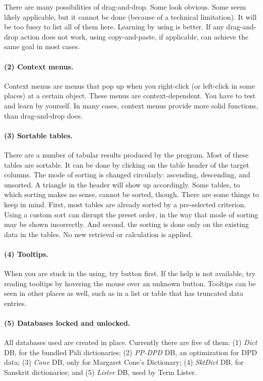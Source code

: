 There are many possibilities of drag-and-drop. Some look obvious. Some seem likely applicable, but it cannot be done (because of a technical limitation). It will be too fussy to list all of them here. Learning by using is better. If any drag-and-drop action does not work, using copy-and-paste, if applicable, can achieve the same goal in most cases.

\paragraph{(2) Context menus.} Context menus are menus that pop up when you right-click (or left-click in some places) at a certain object. These menus are context-dependent. You have to test and learn by yourself. In many cases, context menus provide more solid functions, than drag-and-drop does.

\paragraph{(3) Sortable tables.} There are a number of tabular results produced by the program. Most of these tables are sortable. It can be done by clicking on the table header of the target columns. The mode of sorting is changed circularly: ascending, descending, and unsorted. A triangle in the header will show up accordingly. Some tables, to which sorting makes no sense, cannot be sorted, though. There are some things to keep in mind. First, most tables are already sorted by a pre-selected criterion. Using a custom sort can disrupt the preset order, in the way that mode of sorting may be shown incorrectly. And second, the sorting is done only on the existing data in the tables. No new retrieval or calculation is applied.

\paragraph{(4) Tooltips.} When you are stuck in the using, try {\faSix {}} button first. If the help is not available, try reading tooltips by hovering the mouse over an unknown button. Tooltips can be seen in other places as well, such as in a list or table that has truncated data entries.

\paragraph{(5) Databases locked and unlocked.} All databases used are created in place. Currently there are five of them: (1) \emph{Dict} DB, for the bundled Pāli dictionaries; (2) \emph{PP-DPD} DB, an optimization for DPD data; (3) \emph{Cone} DB, only for Margaret Cone's Dictionary; (4) \emph{SktDict} DB, for Sanskrit dictionaries; and (5) \emph{Lister} DB, used by Term Lister.

